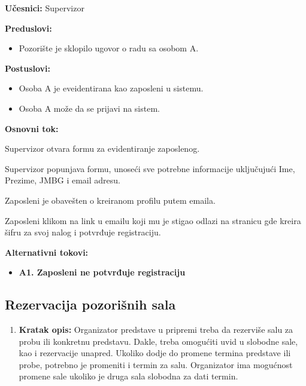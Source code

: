\documentclass[a4paper]{article}
\begin{document}
\noindent\textbf{Učesnici:} Supervizor

\noindent\textbf{Preduslovi:}
  \begin{itemize}
    \item Pozorište je sklopilo ugovor o radu sa osobom A.
  \end{itemize}

\noindent\textbf{Postuslovi:} 
  \begin{itemize}
    \item Osoba A je eveidentirana kao zaposleni u sistemu.
    \item Osoba A može da se prijavi na sistem.
  \end{itemize}

\noindent\textbf{Osnovni tok:}
  \begin{legal}
    \item Supervizor otvara formu za evidentiranje zaposlenog.
    \item Supervizor popunjava formu, unoseći sve potrebne informacije uključujući Ime, Prezime, JMBG i email adresu. 
    \item Zaposleni je obavešten o kreiranom profilu putem emaila. 
    \item Zaposleni klikom na link u emailu koji mu je stigao odlazi na stranicu gde kreira šifru za svoj nalog i potvrđuje registraciju.  
  \end{legal}

\noindent\textbf{Alternativni tokovi:} 
\begin{itemize}
  \item \textbf{A1. Zaposleni ne potvrđuje registraciju} 
\end{itemize}




\subsection{Rezervacija pozorišnih sala}
\begin{enumerate}
  \item \textbf{Kratak opis:} Organizator predstave u pripremi treba da rezerviše salu za probu ili konkretnu predstavu. Dakle, treba omogućiti uvid u slobodne sale, 
        kao i rezervacije unapred. Ukoliko dodje do promene termina predstave ili probe, potrebno je promeniti i termin za salu. Organizator ima mogućnost promene sale ukoliko je druga sala slobodna za dati termin. 
\end{enumerate}
\end{document}
